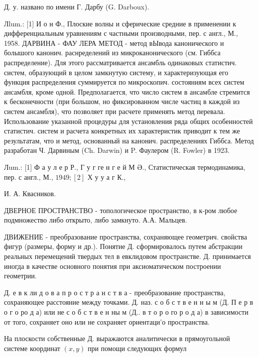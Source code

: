 \documentclass[10pt]{article}
\begin{document}
Д. у. названо по имени Г. Дарбу (G. Darboux).



Лlum.: [1] И о н Ф., Плоские волны и сферические средние в применении к дифференциальным уравнениям с частными производными, пер. с англ., М., 1958. ДАРВИНА - ФАУ ЛЕРА МЕТОД - метод вЫвода канонического и болышого канонич. раснределений из микроканонического (см. Гиббса распределение). Для этого рассматривается ансамбль одинаковых статистич. систем, образующий в целом замкнутую систему, и характеризующая его функция распределения суммируется по микроскопич. состояниям всех систем ансамбля, кроме одной. Предполагается, что число систем в ансамбле стремится к бесконечности (при большом, но фиксированном числе частиц в каждой из систем ансамбля), что позволяет при расчете применять метод перевала. Использование указанной процедуры для установления ряда общих особенностей статистич. систем и расчета конкретных их характеристик приводит к тем же результатам, что и метод, основанный на канонич. распределениях Гиббса. Метод разработан Ч. Дарвиным (Ch. Darwin) и P. Фаулером (R. Fowler) в 1923.



Лum.: [1] Ф а у л е р Р., Г у г ге н г е й М Ә., Статистическая термодинамика, пер. с англ., М., $1949 ;[2]$ Х у у а г К.,



И. А. Квасников.



ДВЕРНОЕ ПРОСТРАНСТВО - топологическое пространство, в к-ром любое подмножество либо открыто, либо замкнуто. $А . А$. Мальцев.



ДВИЖЕНИЕ - преобразование пространства, сохраняющее геометрич. свойства фигур (размеры, форму и др.). Понятие Д. сформировалось путем абстракции реальных перемещений твердых тел в евклидовом пространстве. Д. принимается иногда в качестве основного понятия при аксиоматическом построении геометрии.



Д. е в к ли д о в а п р о с т р а н с т в а - преобразование пространства, сохраняющее расстояние между точками. Д. наз. с о б с т в е н н ы м (Д. П е р в о г о ро д а) или не с о б с т в е н ны м (Д.. в т о р о го р о д а) в зависимости от того, сохраняет оно или не сохраняет ориентаци'о пространства.



На плоскости собственные Д. выражаются аналитически в прямоугольной системе координат $(x, y)$ при помощи следующих формул
\end{document}
